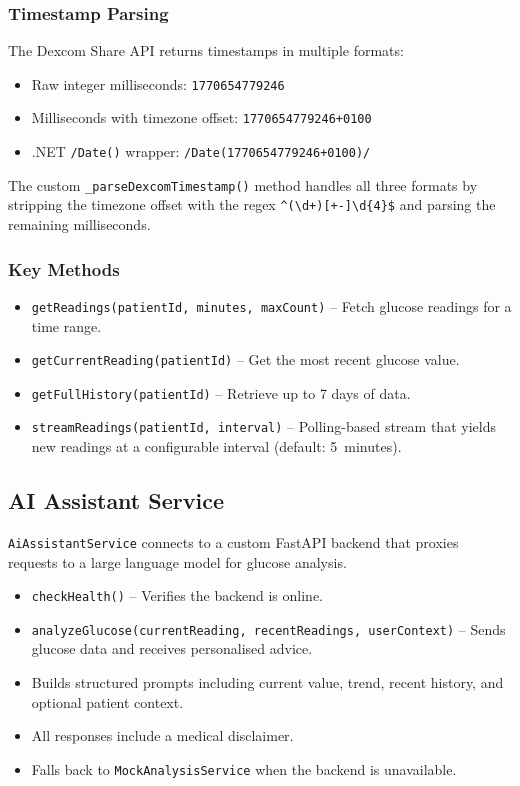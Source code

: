 \documentclass[12pt,a4paper]{article}
\begin{document}
\subsubsection{Timestamp Parsing}

The Dexcom Share API returns timestamps in multiple formats:
\begin{itemize}
    \item Raw integer milliseconds: \texttt{1770654779246}
    \item Milliseconds with timezone offset: \texttt{1770654779246+0100}
    \item .NET \texttt{/Date()} wrapper: \texttt{/Date(1770654779246+0100)/}
\end{itemize}

The custom \texttt{\_parseDexcomTimestamp()} method handles all three formats by stripping the timezone offset with the regex \texttt{\^{}(\textbackslash d+)[+-]\textbackslash d\{4\}\$} and parsing the remaining milliseconds.

\subsubsection{Key Methods}
\begin{itemize}
    \item \texttt{getReadings(patientId, minutes, maxCount)} -- Fetch glucose readings for a time range.
    \item \texttt{getCurrentReading(patientId)} -- Get the most recent glucose value.
    \item \texttt{getFullHistory(patientId)} -- Retrieve up to 7 days of data.
    \item \texttt{streamReadings(patientId, interval)} -- Polling-based stream that yields new readings at a configurable interval (default: 5~minutes).
\end{itemize}

\subsection{AI Assistant Service}

\texttt{AiAssistantService} connects to a custom FastAPI backend that proxies requests to a large language model for glucose analysis.

\begin{itemize}
    \item \texttt{checkHealth()} -- Verifies the backend is online.
    \item \texttt{analyzeGlucose(currentReading, recentReadings, userContext)} -- Sends glucose data and receives personalised advice.
    \item Builds structured prompts including current value, trend, recent history, and optional patient context.
    \item All responses include a medical disclaimer.
    \item Falls back to \texttt{MockAnalysisService} when the backend is unavailable.
\end{itemize}
\end{document}

